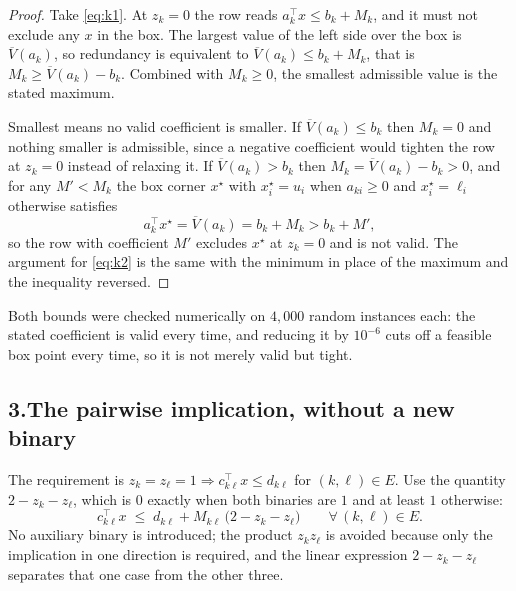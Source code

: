 \documentclass[11pt]{article}
\theoremstyle{definition}\newtheorem*{definition}{Definition}
\theoremstyle{definition}
\begin{document}
\begin{proof}
Take \eqref{eq:k1}. At $z_k = 0$ the row reads
$a_k^{\!\top}x \le b_k + M_k$, and it must not exclude any $x$ in the
box. The largest value of the left side over the box is
$\overline{V}(a_k)$, so redundancy is equivalent to
$\overline{V}(a_k) \le b_k + M_k$, that is
$M_k \ge \overline{V}(a_k) - b_k$. Combined with $M_k \ge 0$, the
smallest admissible value is the stated maximum.

Smallest means no valid coefficient is smaller. If
$\overline{V}(a_k) \le b_k$ then $M_k = 0$ and nothing smaller is
admissible, since a negative coefficient would tighten the row at
$z_k = 0$ instead of relaxing it. If $\overline{V}(a_k) > b_k$ then
$M_k = \overline{V}(a_k) - b_k > 0$, and for any
$M' < M_k$ the box corner $x^{\star}$ with $x^{\star}_i = u_i$ when
$a_{ki} \ge 0$ and $x^{\star}_i = \ell_i$ otherwise satisfies
\[
  a_k^{\!\top} x^{\star} = \overline{V}(a_k) = b_k + M_k > b_k + M',
\]
so the row with coefficient $M'$ excludes $x^{\star}$ at $z_k = 0$ and is
not valid. The argument for \eqref{eq:k2} is the same with the minimum in
place of the maximum and the inequality reversed.
\end{proof}

Both bounds were checked numerically on $4{,}000$ random instances each:
the stated coefficient is valid every time, and reducing it by
$10^{-6}$ cuts off a feasible box point every time, so it is not merely
valid but tight.

\subsection*{3.\quad The pairwise implication, without a new binary}

The requirement is
$z_k = z_\ell = 1 \Rightarrow c_{k\ell}^{\!\top} x \le d_{k\ell}$ for
$(k,\ell) \in E$. Use the quantity $2 - z_k - z_\ell$, which is $0$
exactly when both binaries are $1$ and at least $1$ otherwise:
\begin{equation}
  c_{k\ell}^{\!\top} x \;\le\;
  d_{k\ell} + M_{k\ell}\,\big(2 - z_k - z_\ell\big)
  \qquad \forall\, (k,\ell) \in E .
  \label{eq:pair}
\end{equation}
No auxiliary binary is introduced; the product $z_k z_\ell$ is avoided
because only the implication in one direction is required, and the
linear expression $2 - z_k - z_\ell$ separates that one case from the
other three.
\end{document}

